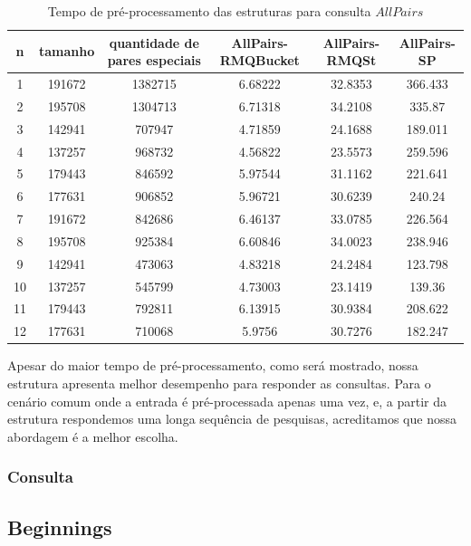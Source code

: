 \documentclass[12pt]{article}
\begin{document}
\begin{table}
\small
\begin{center}
\begin{tabular}{|c|c|c|c|c|c|}
\hline
\textbf{n} & \textbf{tamanho} & \textbf{quantidade de pares especiais} & \textbf{AllPairs-RMQBucket} & \textbf{AllPairs-RMQSt} & \textbf{AllPairs-SP}\\
\hline
1 & 191672 & 1382715 & 6.68222 & 32.8353 & 366.433\\
\hline
2 & 195708 & 1304713 & 6.71318 & 34.2108 & 335.87\\
\hline
3 & 142941 & 707947 & 4.71859 & 24.1688 & 189.011\\
\hline
4 & 137257 & 968732 &  4.56822 &  23.5573 & 259.596\\
\hline
5 & 179443 & 846592 &  5.97544 & 31.1162 & 221.641\\
\hline
6 & 177631 & 906852 & 5.96721 & 30.6239 & 240.24\\
\hline
7 &  191672 & 842686 &  6.46137 & 33.0785 & 226.564\\
\hline
8 & 195708 &  925384 &  6.60846 &  34.0023 & 238.946\\
\hline
9 & 142941 & 473063 &  4.83218 & 24.2484 &  123.798\\
\hline
10 &  137257 &  545799 &  4.73003 & 23.1419 & 139.36\\
\hline
11 &  179443 &  792811 &  6.13915 &  30.9384 &  208.622\\
\hline
12 &  177631 & 710068 & 5.9756 & 30.7276 & 182.247\\
\hline
\end{tabular}

\end{center}
\label{tab:all_pre_series}
\caption{Tempo de pré-processamento das estruturas para consulta $AllPairs$}
\normalsize
\end{table}


Apesar do maior tempo de pré-processamento, como será mostrado, nossa estrutura apresenta
melhor desempenho para responder as consultas. Para o cenário comum onde a entrada
é pré-processada apenas uma vez, e, a partir da estrutura respondemos uma longa
sequência de pesquisas, acreditamos que nossa abordagem é a melhor escolha.


\subsubsection{Consulta}

\subsection{Beginnings}
\end{document}
